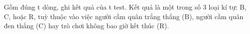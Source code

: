 Gồm đúng t dòng, ghi kết quả của t test. Kết quả là một trong số 3 loại kí tự: B, C, hoặc R, tuỳ thuộc vào việc người cầm quân trắng thắng (B), người cầm quân đen thắng (C) hay trò chơi không bao giờ kết thúc (R).